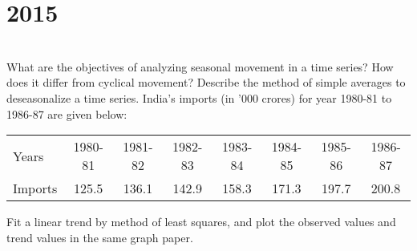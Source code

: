 \section*{2015}
\vspace{-.5cm}
\hrulefill \smallskip\\
 What are the objectives of analyzing seasonal movement in a time series? How does it differ from cyclical movement? Describe the method of simple averages to deseasonalize a time series.
\myline
{} India's imports (in '000 crores) for year 1980-81 to 1986-87 are given below: 
\begin{center}
    \begin{tabular}{l*{7}{c}} 
    Years & 1980-81 & 1981-82 & 1982-83 & 1983-84 & 1984-85 & 1985-86 & 1986-87  \\ 
    Imports  &  125.5 & 136.1 & 142.9 & 158.3 & 171.3 & 197.7 & 200.8\\ 
    \end{tabular}
\end{center} Fit a linear trend by method of least squares, and plot the observed values and trend values in the same graph paper.
